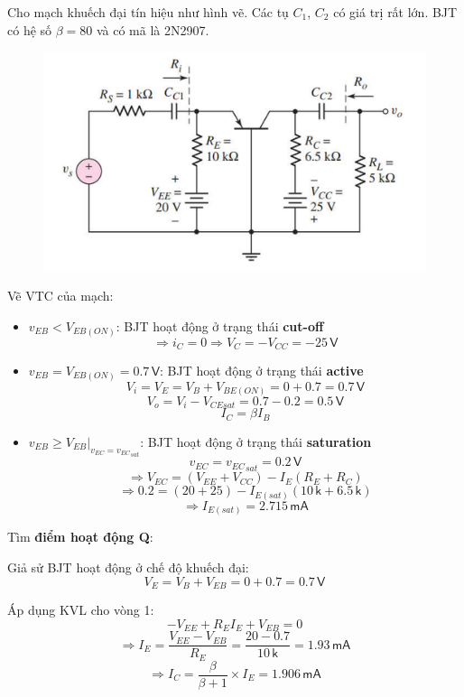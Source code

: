 
 Cho mạch khuếch đại tín hiệu như hình vẽ. Các tụ $C_{1}$, $C_{2}$ có giá trị rất lớn. BJT có hệ số $\beta = 80$ và có mã là 2N2907.
 
 \begin{figure}[H]
 	\centering
	\includegraphics[width=.8\linewidth]{./my-chapters/my-images/Question2/debai.png}
 \end{figure}
 

Vẽ VTC của mạch:

\begin{itemize}[label=-]
	\item $v_{EB}<V_{EB(ON)}$: BJT hoạt động ở trạng thái \textbf{cut-off}  
	\[
	\Rightarrow i_{C}=0 \Rightarrow V_{C}=-V_{CC}=-25\,\textsf{V}
	\]
	
	\item $v_{EB}=V_{EB(ON)}=0.7\,\textsf{V}$: BJT hoạt động ở trạng thái \textbf{active}  
	\[
	V_{i}=V_{E}=V_{B}+V_{BE(ON)}=0+0.7=0.7\,\textsf{V}
	\]
	\[
	V_{o}=V_{i}-V_{CEsat}=0.7-0.2=0.5\,\textsf{V}
	\]
	\[
	I_{C}=\beta I_{B}
	\]
	
	\item $v_{EB}\geq\left.V_{EB}\right|_{v_{EC}={v_{EC}}_{sat}}$: BJT hoạt động ở trạng thái \textbf{saturation}  
	\[
	v_{EC}={v_{EC}}_{sat}=0.2\,\textsf{V}
	\]
	\[
	\Rightarrow V_{EC}=(V_{EE}+V_{CC})-I_{E}(R_{E}+R_{C})
	\]
	\[
	\Rightarrow 0.2=(20+25)-I_{E(sat)}(10\,\textsf{k}+6.5\,\textsf{k})
	\]
	\[
	\Rightarrow I_{E(sat)}=2.715\,\textsf{mA}
	\]
\end{itemize}

Tìm \textbf{điểm hoạt động Q}:

Giả sử BJT hoạt động ở chế độ khuếch đại:
\[
V_{E}=V_{B}+V_{EB}=0+0.7=0.7\,\textsf{V}
\]

Áp dụng KVL cho vòng 1:
\[
- V_{EE}+R_{E}I_{E}+V_{EB}=0
\]
\[
\Rightarrow I_{E}=\frac{V_{EE}-V_{EB}}{R_{E}}=\frac{20-0.7}{10\,\textsf{k}}=1.93\,\textsf{mA}
\]
\[
\Rightarrow I_{C}=\frac{\beta}{\beta+1}\times I_{E}=1.906\,\textsf{mA}
\]

